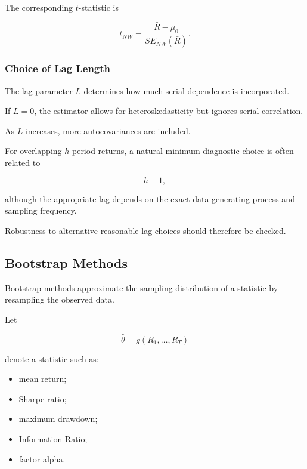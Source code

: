 \documentclass[11pt,a4paper]{article}
\begin{document}
The corresponding $t$-statistic is

\begin{equation}
\boxed{
t_{NW}
=
\frac{
\bar{R}-\mu_0
}{
SE_{NW}(\bar{R})
}.
}
\end{equation}


\subsubsection{Choice of Lag Length}

The lag parameter $L$ determines how much serial dependence is incorporated.

If $L=0$, the estimator allows for heteroskedasticity but ignores serial
correlation.

As $L$ increases, more autocovariances are included.

For overlapping $h$-period returns, a natural minimum diagnostic choice is
often related to

\begin{equation}
h-1,
\end{equation}

although the appropriate lag depends on the exact data-generating process and
sampling frequency.

Robustness to alternative reasonable lag choices should therefore be checked.


\subsection{Bootstrap Methods}
\label{subsec:bootstrap_methods}

Bootstrap methods approximate the sampling distribution of a statistic by
resampling the observed data.

Let

\begin{equation}
\widehat{\theta}
=
g
\left(
R_1,\ldots,R_T
\right)
\end{equation}

denote a statistic such as:

\begin{itemize}
    \item mean return;
    \item Sharpe ratio;
    \item maximum drawdown;
    \item Information Ratio;
    \item factor alpha.
\end{itemize}
\end{document}
